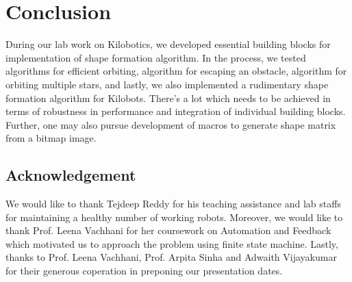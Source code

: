 \documentclass{report}[12pt]
\begin{document}
\chapter{Conclusion}
During our lab work on Kilobotics, we developed essential building blocks for implementation of shape formation algorithm. In the process, we tested algorithms for efficient orbiting, algorithm for escaping an obstacle, algorithm for orbiting multiple stars, and lastly, we also implemented a rudimentary shape formation algorithm for Kilobots. There's a lot which needs to be achieved in terms of robustness in performance and integration of individual building blocks. Further, one may also pursue development of macros to generate shape matrix from a bitmap image.
\section{Acknowledgement}
We would like to thank Tejdeep Reddy for his teaching assistance and lab staffs for maintaining a healthy number of working robots. Moreover, we would like to thank Prof. Leena Vachhani for her coursework on Automation and Feedback which motivated us to approach the problem using finite state machine. Lastly, thanks to Prof. Leena Vachhani, Prof. Arpita Sinha and Adwaith Vijayakumar for their generous coperation in preponing our presentation dates. 
{}

\end{document}

